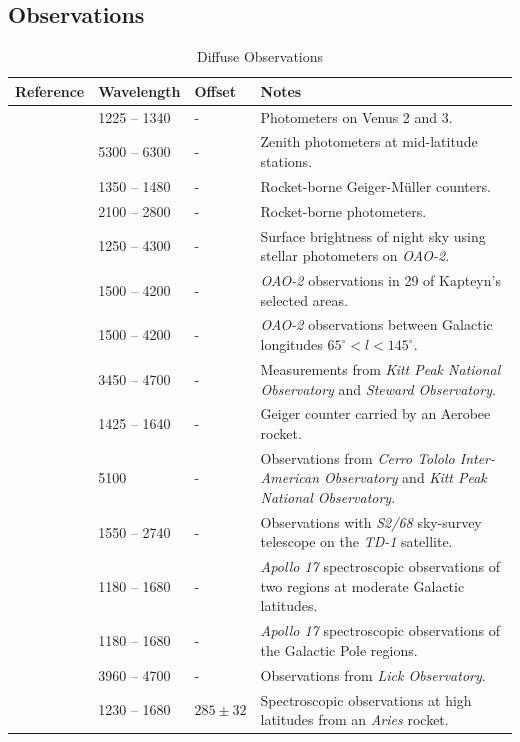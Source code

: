 \documentclass{iau}
\begin{document}
\subsection{Observations}

\begin{longtable}{lllp{9cm}}
\caption{Diffuse Observations} \label{TAB:missions} \\
\hline
Reference & Wavelength & Offset & Notes  \\
\hline
\citet{Kurt1968} & 1225 -- 1340 & - & Photometers on Venus 2 and 3. \\
\citet{Roach1968} & 5300 -- 6300 & - & Zenith photometers at mid-latitude stations.\\
\citet{Hayakawa1969} & 1350 -- 1480 & - & Rocket-borne Geiger-M\"{u}ller counters.\\
\citet{Lillie1969} & 2100 -- 2800 & - & Rocket-borne photometers. \\ 
\citet{Lillie1972} & 1250 -- 4300 & - & Surface brightness of night sky using stellar photometers on \textit{OAO-2}. \\
\citet{Witt1973} & 1500 -- 4200 & - & \textit{OAO-2} observations in 29 of Kapteyn's selected areas. \\
\citet{Lillie1976} & 1500 -- 4200 & - & \textit{OAO-2} observations between Galactic longitudes $65^{\circ} < l < 145^{\circ}$. \\
\citet{Mattila1976} & 3450 -- 4700 & - & Measurements from \textit{Kitt Peak National Observatory} and \textit{Steward Observatory}. \\
\citet{Henry1977ApJ} & 1425 -- 1640 & - & Geiger counter carried by an Aerobee rocket. \\
\citet{Dube1977} & 5100 & - & Observations from \textit{Cerro Tololo Inter-American Observatory} and \textit{Kitt Peak National Observatory}. \\
\citet{Morgan1978} & 1550 -- 2740 & - & Observations with \textit{S2/68} sky-survey telescope on the \textit{TD-1} satellite. \\
\citet{Henry_dust1978} & 1180 -- 1680 & - & \textit{Apollo 17} spectroscopic observations of two regions at moderate Galactic latitudes. \\
\citet{Henry_ngp1978} & 1180 -- 1680 & - & \textit{Apollo 17} spectroscopic observations of the Galactic Pole regions. \\
\citet{Spinrad1978} & 3960 -- 4700 & - & Observations from \textit{Lick Observatory}. \\
\citet{Anderson1979} & 1230 -- 1680 & $285 \pm 32$ & Spectroscopic observations at high latitudes from an \textit{Aries} rocket. \\

\end{longtable}
\end{document}
